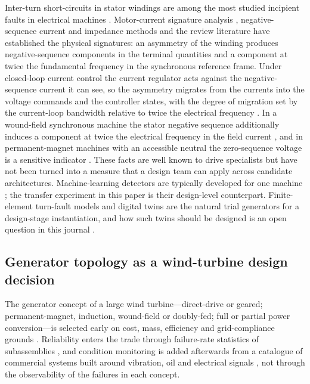 Inter-turn short-circuits in stator windings are among the most studied incipient faults in electrical machines \citep{RieraGuasp2015}. Motor-current signature analysis \citep{Thomson2001}, negative-sequence current and impedance methods \citep{Lee2003} and the review literature \citep{Nandi2005} have established the physical signatures: an asymmetry of the winding produces negative-sequence components in the terminal quantities and a component at twice the fundamental frequency in the synchronous reference frame. Under closed-loop current control the current regulator acts against the negative-sequence current it can see, so the asymmetry migrates from the currents into the voltage commands and the controller states, with the degree of migration set by the current-loop bandwidth relative to twice the electrical frequency \citep{Tallam2003, Cruz2004}. In a wound-field synchronous machine the stator negative sequence additionally induces a component at twice the electrical frequency in the field current \citep{Neti2009}, and in permanent-magnet machines with an accessible neutral the zero-sequence voltage is a sensitive indicator \citep{Urresty2012}. These facts are well known to drive specialists but have not been turned into a measure that a design team can apply across candidate architectures. Machine-learning detectors are typically developed for one machine \citep{Canseven2026machines, Sadik2026}; the transfer experiment in this paper is their design-level counterpart. Finite-element turn-fault models \citep{Vaseghi2009} and digital twins \citep{Tao2019} are the natural trial generators for a design-stage instantiation, and how such twins should be designed is an open question in this journal \citep{Tipuric2026}.

\subsection{Generator topology as a wind-turbine design decision}

The generator concept of a large wind turbine---direct-drive or geared; permanent-magnet, induction, wound-field or doubly-fed; full or partial power conversion---is selected early on cost, mass, efficiency and grid-compliance grounds \citep{Polinder2006, Polinder2013}. Reliability enters the trade through failure-rate statistics of subassemblies \citep{Carroll2016}, and condition monitoring is added afterwards from a catalogue of commercial systems built around vibration, oil and electrical signals \citep{Yang2014}, not through the observability of the failures in each concept.
